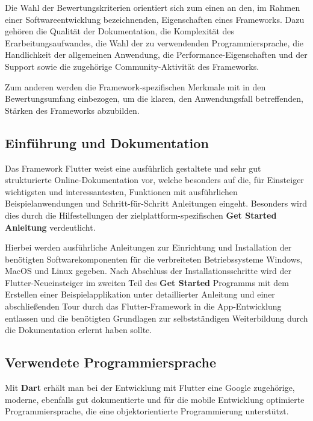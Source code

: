 \documentclass[bibliography=totoc,listof=totoc,BCOR=5mm,DIV=12,oneside]{scrbook}
\begin{document}
\par \bigskip Die Wahl der Bewertungskriterien orientiert sich zum einen an den, im Rahmen einer Softwareentwicklung bezeichnenden, Eigenschaften eines Frameworks. Dazu gehören die Qualität der Dokumentation, die Komplexität des Erarbeitungsaufwandes, die Wahl der zu verwendenden Programmiersprache, die  Handlichkeit der allgemeinen Anwendung, die Performance-Eigenschaften und der Support sowie die zugehörige Community-Aktivität des Frameworks. \par Zum anderen werden die Framework-spezifischen Merkmale mit in den Bewertungsumfang einbezogen, um die klaren, den Anwendungsfall betreffenden, Stärken des Frameworks abzubilden.

\subsection{Einführung und Dokumentation}
\par Das Framework Flutter weist eine ausführlich gestaltete und sehr gut strukturierte Online-Dokumentation vor, welche besonders auf die, für Einsteiger wichtigsten und interessantesten, Funktionen mit ausführlichen Beispielanwendungen und Schritt-für-Schritt Anleitungen eingeht.
Besonders wird dies durch die Hilfestellungen der zielplattform-spezifischen \textbf{Get Started Anleitung}\citep{FlutterGetStarted}  verdeutlicht.

\par \bigskip Hierbei werden ausführliche Anleitungen zur Einrichtung und Installation der benötigten Softwarekomponenten für die verbreiteten Betriebssysteme Windows, MacOS und Linux  gegeben. Nach Abschluss der Installationsschritte wird der Flutter-Neueinsteiger im zweiten Teil des \textbf{Get Started} Programms mit dem Erstellen einer Beispielapplikation unter detaillierter Anleitung und einer abschließenden Tour durch das Flutter-Framework in die App-Entwicklung entlassen und die benötigten Grundlagen zur selbstständigen Weiterbildung durch die Dokumentation erlernt haben sollte. 

\subsection{Verwendete Programmiersprache}
\par Mit \textbf{Dart}\citep{DartLangHomepage} erhält man bei der Entwicklung mit Flutter eine Google zugehörige, moderne, ebenfalls gut dokumentierte und für die mobile Entwicklung optimierte Programmiersprache, die eine objektorientierte Programmierung unterstützt. 
\end{document}
